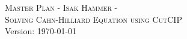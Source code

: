 \documentclass[landscape,a4paper]{article}
\begin{document}
\pagestyle{empty} %

\noindent



\begin{center}
\textsc{\LARGE Master Plan - Isak Hammer - }\\
\textsc{\large Solving Cahn-Hilliard Equation using CutCIP}\\
Version: \today

\end{center}
\end{document}
